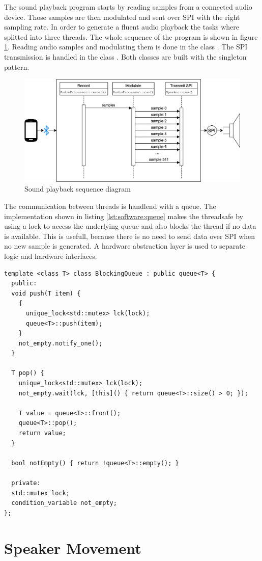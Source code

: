 The sound playback program starts by reading samples from a connected audio device. Those samples are then modulated and sent over SPI with the right sampling rate. In order to generate a fluent audio playback the tasks where splitted into three threads. The whole sequence of the program is shown in figure \ref{fig:software:sound_sequence}.\p
%
Reading audio samples and modulating them is done in the class . The SPI transmission is handled in the class . Both classes are built with the singleton pattern.
%
\begin{figure}
  \centering
  \includegraphics[width=\textwidth]{src/assets/pictures/software/sequence_diagramm.png}
  \caption{Sound playback sequence diagram}\label{fig:software:sound_sequence}
\end{figure}
\p
The communication between threads is handlend with a queue. The implementation shown in listing \ref{lst:software:queue} makes the  threadsafe by using a lock to access the underlying queue and also blocks the thread if no data is available. This is usefull, because there is no need to send data over SPI when no new sample is generated.\p
%
A hardware abstraction layer is used to separate logic and hardware interfaces.
%
\begin{mdframed}
\begin{lstlisting}[caption=Threadsafe and blocking queue, label=lst:software:queue]
template <class T> class BlockingQueue : public queue<T> {
  public:
  void push(T item) {
    {
      unique_lock<std::mutex> lck(lock);
      queue<T>::push(item);
    }
    not_empty.notify_one();
  }

  T pop() {
    unique_lock<std::mutex> lck(lock);
    not_empty.wait(lck, [this]() { return queue<T>::size() > 0; });

    T value = queue<T>::front();
    queue<T>::pop();
    return value;
  }

  bool notEmpty() { return !queue<T>::empty(); }

  private:
  std::mutex lock;
  condition_variable not_empty;
};
\end{lstlisting}
\end{mdframed}



\clearpage

\section{Speaker Movement}
